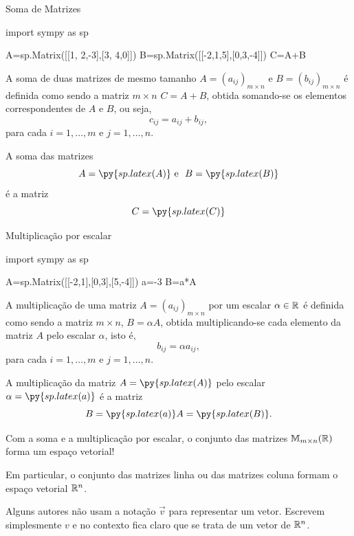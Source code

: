 \begin{frame}[label=matrizes,fragile=singleslide]{Soma de Matrizes}
\begin{pycode}
import sympy as sp

A=sp.Matrix([[1, 2,-3],[3, 4,0]])
B=sp.Matrix([[-2,1,5],[0,3,-4]])
C=A+B
\end{pycode}

A {\color{blue} soma} de duas matrizes de {\color{blue} mesmo tamanho} $A=(a_{ij})_{m\times n}$ e $B=(b_{ij})_{m\times n}$ é definida como sendo a matriz $m\times n$ $C=A+B$, obtida somando-se os elementos correspondentes de $A$ e $B$, ou seja, 
\[c_{ij}=a_{ij}+b_{ij},\]
para cada $i=1,\ldots,m$ e $j=1,\ldots,n$.

\begin{exe}
A soma das matrizes \[
A=\py{sp.latex(A)} \text{ e } \ 
B=\py{sp.latex(B)}
\]
é a matriz 
\[C=\py{sp.latex(C)}\]
\end{exe}
\end{frame}


\begin{frame}[label=matrizes,fragile=singleslide]{Multiplicação por escalar}
\begin{pycode}
import sympy as sp

A=sp.Matrix([[-2,1],[0,3],[5,-4]])
a=-3
B=a*A
\end{pycode}

A {\color{blue} multiplicação de uma matriz} $A=(a_{ij})_{m\times n}$  {\color{blue} por um escalar} $\alpha\in \mathbb{R}$ é definida como sendo a matriz $m\times n$, $B=\alpha A$, obtida multiplicando-se cada elemento da matriz $A$ pelo escalar $\alpha$, isto é,
\[b_{ij}=\alpha a_{ij},\]
para cada $i=1,\ldots,m$ e $j=1,\ldots,n$.



\end{frame}

\begin{frame}[label=matrizes]

\begin{exe}
A multiplicação  da matriz $A=\py{sp.latex(A)} $ pelo escalar $\alpha=\py{sp.latex(a)}$ é a matriz
\[B=\py{sp.latex(a)} A=\py{sp.latex(B)}.\]
\end{exe}

\begin{block}{}
Com a soma e a multiplicação por escalar, {\color{blue}o conjunto das matrizes $\mathbb{M}_{m\times n}(\mathbb{R})$ forma um espaço vetorial}!
\medskip

Em particular, o conjunto das  matrizes linha ou das matrizes coluna formam o espaço vetorial $\mathbb{R}^n$.
\medskip

Alguns autores não usam a notação $\vec{v}$ para representar um vetor. Escrevem simplesmente $v$ e no contexto fica claro que se trata de um vetor de $\mathbb{R}^n$.
\end{block}

\end{frame}

